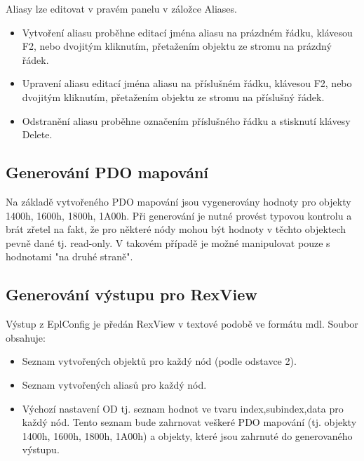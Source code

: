 Aliasy lze editovat v pravém panelu v záložce Aliases.
\begin{itemize}
\item Vytvoření aliasu proběhne
\subitem editací jména aliasu na prázdném řádku, klávesou F2, nebo dvojitým kliknutím, 
\subitem přetažením objektu ze stromu na prázdný řádek.
\item Upravení aliasu
\subitem editací jména aliasu na příslušném řádku, klávesou F2, nebo dvojitým kliknutím, 
\subitem přetažením objektu ze stromu na příslušný řádek.
\item Odstranění aliasu proběhne označením příslušného řádku a stisknutí klávesy Delete.
\end{itemize}

\subsection{Generování PDO mapování}
Na základě vytvořeného PDO mapování jsou vygenerovány hodnoty pro objekty 1400h, 1600h, 1800h, 1A00h. 
Při generování je nutné provést typovou kontrolu a brát zřetel na fakt, 
že pro některé nódy mohou být hodnoty v těchto objektech pevně dané tj. read-only. 
V takovém případě je možné manipulovat pouze s hodnotami "na druhé straně".

\subsection{Generování výstupu pro RexView}
Výstup z EplConfig je předán RexView v textové podobě ve formátu mdl. Soubor obsahuje:
\begin{itemize}
\item Seznam vytvořených objektů pro každý nód (podle odstavce 2).
\item Seznam vytvořených aliasů pro každý nód.
\item Výchozí nastavení OD tj. seznam hodnot ve tvaru index,subindex,data pro každý nód. 
Tento seznam bude zahrnovat veškeré PDO mapování (tj. objekty 1400h, 1600h, 1800h, 1A00h) a objekty, 
které jsou zahrnuté do generovaného výstupu.
\end{itemize}


